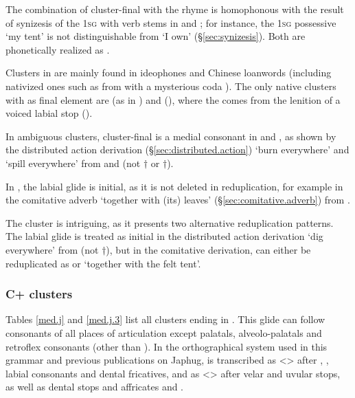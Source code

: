 The combination of cluster-final  with the rhyme  is homophonous with the result of synizesis of the \textsc{1sg}  with verb stems in  and ; for instance, the \textsc{1sg} possessive  `my tent'  is not distinguishable from  `I own' (§\ref{sec:synizesis}). Both are phonetically realized as .

Clusters in  are mainly found in ideophones and Chinese loanwords (including nativized ones such as  from  with a mysterious coda ). The only native clusters with  as final element are  (as in ) and  (), where the  comes from the lenition of a voiced labial stop (\citealt[325--329]{jacques04these}).

In ambiguous clusters, cluster-final  is a medial consonant in  and , as shown by the distributed action derivation (§\ref{sec:distributed.action})  `burn everywhere' and  `spill everywhere' from  and  (not $\dagger$ or $\dagger$). 

In , the labial glide is initial, as it is not deleted in reduplication, for example in the comitative adverb  `together with (its) leaves' (§\ref{sec:comitative.adverb}) from .

The cluster  is intriguing, as it presents two alternative reduplication patterns. The labial glide is treated as initial in the distributed action derivation  `dig everywhere' from  (not $\dagger$), but in the comitative derivation,  can either be reduplicated as  or  `together with the felt tent'.

\subsubsection{C+ clusters} \label{sec:Cj.clusters}
Tables \ref{med.j} and \ref{med.j.3} list all clusters ending in . This glide can follow consonants of all places of articulation except palatals, alveolo-palatals and retroflex consonants (other than ). In the orthographical system used in this grammar and previous publications on Japhug,  is transcribed as <> after , , labial consonants and dental fricatives, and as  <> after velar and uvular stops, as well as dental stops and affricates and .


